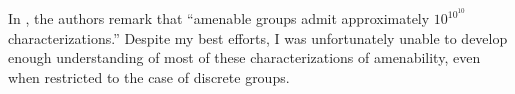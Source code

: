 In \cite[48]{brown_and_ozawa}, the authors remark that ``amenable groups admit approximately $10^{10^{10}}$ characterizations.'' Despite my best efforts, I was unfortunately unable to develop enough understanding of most of these characterizations of amenability, even when restricted to the case of discrete groups.
